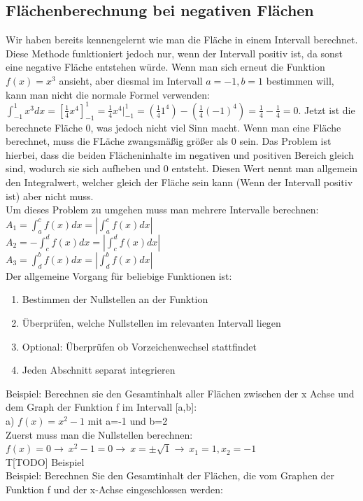 \documentclass{article}
\begin{document}
	\subsection{Flächenberechnung bei negativen Flächen}
	Wir haben bereits kennengelernt wie man die Fläche in einem Intervall berechnet. Diese Methode funktioniert jedoch nur, wenn der Intervall positiv ist, da sonst eine negative Fläche entstehen würde. Wenn man sich erneut die Funktion $f(x)=x^3$ ansieht, aber diesmal im Intervall $a=-1, b=1$ bestimmen will, kann man nicht die normale Formel verwenden:$\int_{-1}^{1}x^3dx=[\frac{1}{4}x^4]^1_{-1}=\frac{1}{4}x^4|^1_{-1}=(\frac{1}{4}1^4)-(\frac{1}{4}(-1)^4)=\frac{1}{4}-\frac{1}{4}=0$. Jetzt ist die berechnete Fläche 0, was jedoch nicht viel Sinn macht. Wenn man eine Fläche berechnet, muss die FLäche zwangsmäßig größer als 0 sein. Das Problem ist hierbei, dass die beiden Flächeninhalte im negativen und positiven Bereich gleich sind, wodurch sie sich aufheben und 0 entsteht. Diesen Wert nennt man allgemein den Integralwert, welcher gleich der Fläche sein kann (Wenn der Intervall positiv ist) aber nicht muss. \\
	Um dieses Problem zu umgehen muss man mehrere Intervalle berechnen: \\
	$A_1=\int_{a}^{c}f(x)dx=|\int_{a}^{c}f(x)dx|$ \\
	$A_2=-\int_{c}^{d}f(x)dx=|\int_{c}^{d}f(x)dx|$ \\
	$A_3=\int_{d}^{b}f(x)dx=|\int_{d}^{b}f(x)dx|$ \\
	Der allgemeine Vorgang für beliebige Funktionen ist:
	\begin{enumerate}
		\item{Bestimmen der Nullstellen an der Funktion}
		\item{Überprüfen, welche Nullstellen im relevanten Intervall liegen}
		\item{Optional: Überprüfen ob Vorzeichenwechsel stattfindet}
		\item{Jeden Abschnitt separat integrieren}
	\end{enumerate}
	Beispiel: Berechnen sie den Gesamtinhalt aller Flächen zwischen der x Achse und dem Graph der Funktion f im Intervall [a,b]: \\
	a) $f(x)=x^2-1$ mit a=-1 und b=2 \\
	Zuerst muss man die Nullstellen berechnen: $f(x)=0\to\ x^2-1=0\to\ x=\pm\sqrt{1}\to\ x_1=1, x_2=-1$ \\
	T[TODO] Beispiel \\
	Beispiel: Berechnen Sie den Gesamtinhalt der Flächen, die vom Graphen der Funktion f und der x-Achse eingeschlossen werden: \\
\end{document}
